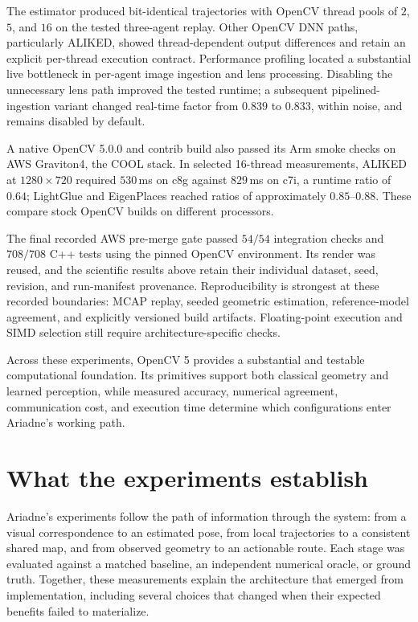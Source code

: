 \documentclass[10pt,a4paper]{article}
\begin{document}
The estimator produced bit-identical trajectories with
OpenCV thread pools of $2$, $5$, and $16$ on the tested
three-agent replay. Other OpenCV DNN paths, particularly
ALIKED, showed thread-dependent output differences and
retain an explicit per-thread execution contract.
Performance profiling located a substantial live bottleneck
in per-agent image ingestion and lens processing. Disabling
the unnecessary lens path improved the tested runtime;
a subsequent pipelined-ingestion variant changed real-time
factor from $0.839$ to $0.833$, within noise, and remains
disabled by default.

A native OpenCV 5.0.0 and contrib build also passed its
Arm smoke checks on AWS Graviton4, the COOL stack.
In selected 16-thread
measurements, ALIKED at $1280\times720$ required
$530$\,ms on c8g against $829$\,ms on c7i,
a runtime ratio of $0.64$; LightGlue and EigenPlaces
reached ratios of approximately $0.85$--$0.88$.
These compare stock OpenCV builds on different processors.

The final recorded AWS pre-merge gate passed $54/54$
integration checks and $708/708$ C++ tests using the
pinned OpenCV environment. Its render was reused, and
the scientific results above retain their individual
dataset, seed, revision, and run-manifest provenance.
Reproducibility is strongest at these recorded boundaries:
MCAP replay, seeded geometric estimation, reference-model
agreement, and explicitly versioned build artifacts.
Floating-point execution and SIMD selection still require
architecture-specific checks.

Across these experiments, OpenCV 5 provides a substantial
and testable computational foundation. Its primitives
support both classical geometry and learned perception,
while measured accuracy, numerical agreement, communication
cost, and execution time determine which configurations
enter Ariadne's working path.




\section{What the experiments establish}

Ariadne's experiments follow the path of information through the system:
from a visual correspondence to an estimated pose, from local trajectories
to a consistent shared map, and from observed geometry to an actionable
route. Each stage was evaluated against a matched baseline, an independent
numerical oracle, or ground truth. Together, these measurements explain
the architecture that emerged from implementation, including several
choices that changed when their expected benefits failed to materialize.
\end{document}
